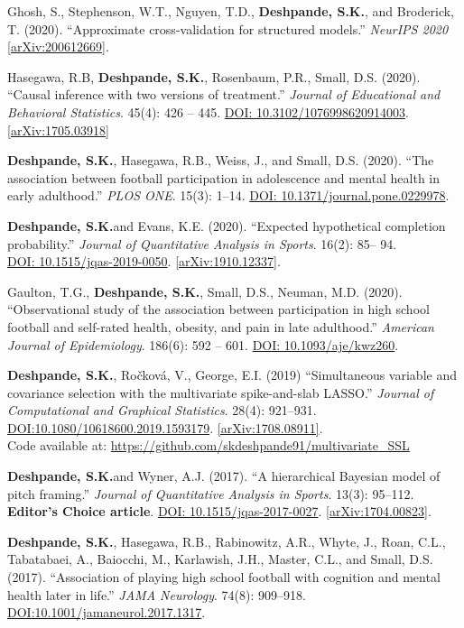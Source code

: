 \documentclass[margin]{res}
\def\skd{\textbf{Deshpande, S.K.}}
\begin{document}
\begin{resume}
Ghosh, S., Stephenson, W.T., Nguyen, T.D., \skd, and Broderick, T. (2020). ``Approximate cross-validation for structured models.'' \textit{NeurIPS 2020} \href{https://arxiv.org/abs/2006.12669}{[arXiv:200612669]}. 

Hasegawa, R.B, \skd, Rosenbaum, P.R., Small, D.S. (2020). ``Causal inference with two versions of treatment.'' \textit{Journal of Educational and Behavioral Statistics}. 45(4): 426 -- 445. \href{https://doi.org/10.3102/1076998620914003}{DOI: 10.3102/1076998620914003}. \href{https://arxiv.org/abs/1705.03918}{[arXiv:1705.03918]}

\skd, Hasegawa, R.B., Weiss, J., and Small, D.S. (2020). ``The association between football participation in adolescence and mental health in early adulthood.'' \textit{PLOS ONE}. 15(3): 1--14. \href{https://doi.org/10.1371/journal.pone.0229978}{DOI: 10.1371/journal.pone.0229978}.

\skd and Evans, K.E. (2020). ``Expected hypothetical completion probability.'' \textit{Journal of Quantitative Analysis in Sports}. 16(2): 85-- 94.\\ \href{https://doi.org/10.1515/jqas-2019-0050}{DOI: 10.1515/jqas-2019-0050}. \href{https://arxiv.org/abs/1910.12337}{[arXiv:1910.12337]}.

Gaulton, T.G., \skd, Small, D.S., Neuman, M.D. (2020). ``Observational study of the association between participation in high school football and self-rated health, obesity, and pain in late adulthood.'' \textit{American Journal of Epidemiology}. 186(6): 592 -- 601. \href{https://doi.org/10.1093/aje/kwz260}{DOI: 10.1093/aje/kwz260}.

\skd, Ro\v{c}kov\'{a}, V.,  George, E.I. (2019) ``Simultaneous variable and covariance selection with the multivariate spike-and-slab LASSO.'' \textit{Journal of Computational and Graphical Statistics}. 28(4): 921--931. \href{https://doi.org/10.1080/10618600.2019.1593179}{DOI:10.1080/10618600.2019.1593179}. \href{https://arxiv.org/abs/1708.08911}{[arXiv:1708.08911]}. \\ Code available at: \url{https://github.com/skdeshpande91/multivariate_SSL}

\skd and Wyner, A.J. (2017). ``A hierarchical Bayesian model of pitch framing.'' \textit{Journal of Quantitative Analysis in Sports}. 13(3): 95--112. \textbf{Editor's Choice article}.   \href{https://doi.org/10.1515/jqas-2017-0027}{DOI: 10.1515/jqas-2017-0027}. \href{https://arxiv.org/abs/1704.00823}{[arXiv:1704.00823]}.

\skd, Hasegawa, R.B., Rabinowitz, A.R., Whyte, J., Roan, C.L., Tabatabaei, A., Baiocchi, M., Karlawish, J.H., Master, C.L., and Small, D.S. (2017). ``Association of playing high school football with cognition and mental health later in life.'' \textit{JAMA Neurology}. 74(8): 909--918. \href{https://doi.org/10.1001/jamaneurol.2017.1317}{DOI:10.1001/jamaneurol.2017.1317}.


\end{resume}
\end{document}

